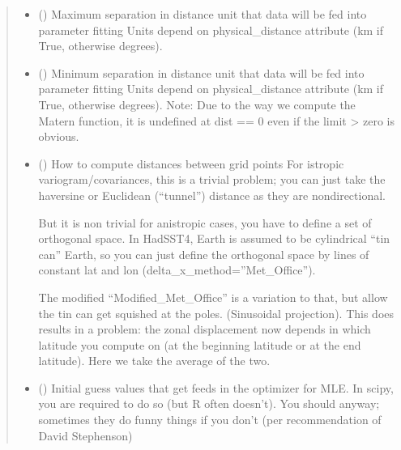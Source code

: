 \documentclass[letterpaper,10pt,english]{sphinxmanual}
\begin{document}
\begin{fulllineitems}
\begin{fulllineitems}
\begin{quote}
\begin{description}
\begin{itemize}
\item {}
\sphinxAtStartPar
{} () \textendash{} Maximum separation in distance unit that data will be fed
into parameter fitting
Units depend on physical\_distance attribute (km if True, otherwise
degrees).

\item {}
\sphinxAtStartPar
{} () \textendash{} Minimum separation in distance unit that data
will be fed into parameter fitting
Units depend on physical\_distance attribute (km if True, otherwise
degrees).
Note: Due to the way we compute the Matern function,
it is undefined at dist == 0 even if the limit \sphinxhyphen{}\textgreater{} zero is obvious.

\item {}
\sphinxAtStartPar
{} () \textendash{}
\sphinxAtStartPar
How to compute distances between grid points
For istropic variogram/covariances, this is a trivial problem;
you can just take the haversine or
Euclidean (“tunnel”) distance as they are non\sphinxhyphen{}directional.

\sphinxAtStartPar
But it is non trivial for anistropic cases,
you have to define a set of orthogonal space. In HadSST4,
Earth is assumed to be cylindrical “tin can” Earth,
so you can just define the orthogonal space by
lines of constant lat and lon (delta\_x\_method=”Met\_Office”).

\sphinxAtStartPar
The modified “Modified\_Met\_Office” is a variation to that,
but allow the tin can get squished at the poles.
(Sinusoidal projection). This does results in a problem:
the zonal displacement now depends in which latitude
you compute on (at the beginning latitude or at the end latitude).
Here we take the average of the two.


\item {}
\sphinxAtStartPar
{} () \textendash{} Initial guess values that get feeds in the optimizer for MLE.
In scipy, you are required to do so (but R often doesn’t).
You should anyway; sometimes they do funny things
if you don’t (per recommendation of David Stephenson)


\end{itemize}
\end{description}
\end{quote}
\end{fulllineitems}
\end{fulllineitems}
\end{document}
